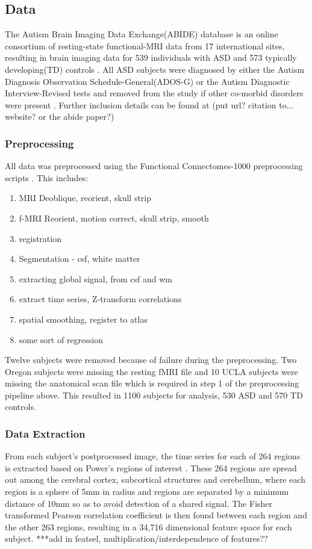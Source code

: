 \documentclass{llncs}
\begin{document}
\subsection{Data}
The Autism Brain Imaging Data Exchange(ABIDE) database is an online consortium of resting-state functional-MRI data from 17 international sites, resulting in brain imaging data for 539 individuals with ASD and 573 typically developing(TD)  controls \cite{abide}. All ASD subjects were diagnosed by either the Autism Diagnosis Observation Schedule-General(ADOS-G) or the Autism Diagnostic Interview-Revised tests and removed from the study if other co-morbid disorders were present \cite{lordADOS} \cite{lordADIR} \cite{abide}.  Further inclusion details can be found at (put url? citation to... website? or the abide paper?)
\subsubsection{Preprocessing}
All data was preprocessed using the Functional Connectomes-1000 preprocessing scripts \cite{fcon}. This includes:
\begin{enumerate}
\item MRI Deoblique, reorient, skull strip
\item f-MRI Reorient, motion correct, skull strip, smooth
\item registration 
\item Segmentation - csf, white matter
\item extracting global signal, from csf and wm
\item extract time series, Z-transform correlations
\item spatial smoothing, register to atlas
\item some sort of regression
\end{enumerate}
Twelve subjects were removed because of failure during the preprocessing.  Two Oregon subjects were missing the resting fMRI file and 10 UCLA subjects were missing the anatomical scan file which is required in step 1 of the preprocessing pipeline above. This resulted in 1100 subjects for analysis, 530 ASD and 570 TD controls. 
\subsubsection{Data Extraction}
From each subject's postprocessed image, the time series for each of 264 regions is extracted based on Power's regions of interest \cite{Powers}. These 264 regions are spread out among the cerebral cortex, subcortical structures and cerebellum, where each region is a sphere of 5mm in radius and regions are separated by a minimum distance of 10mm so as to avoid detection of a shared signal. The Fisher transformed Pearson correlation coefficient is then found between each region and the other 263 regions, resulting in a 34,716 dimensional feature space for each subject. 
***add in featsel, multiplication/interdependence of features??
\end{document}

